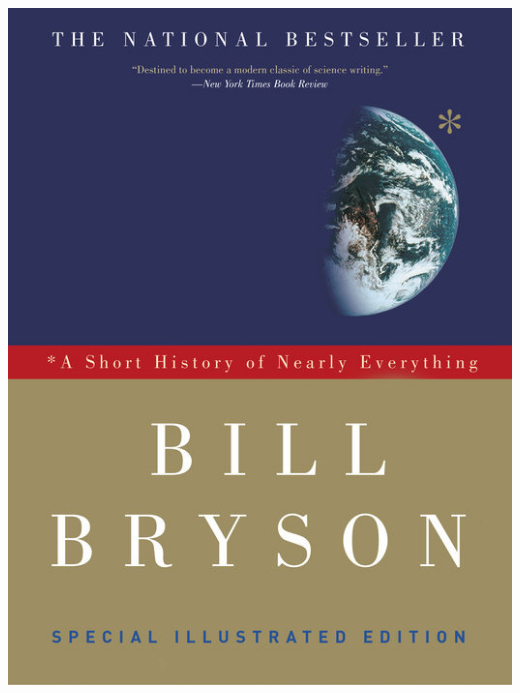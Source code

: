 \documentclass{tufte-handout}
\makeatletter
\newcommand{\varcaption}[2][0pt]{%
  \gsetlength{\@tufte@caption@vertical@offset}{-#1}%
  \gdef\@tufte@stored@varcaption{#2}%
}
\gdef\@tufte@stored@varcaption{} %
\makeatother
\begin{document}
\begin{marginfigure}[-10\baselineskip]
   \includegraphics[width=\linewidth]{images/short_history_of_nearly_everything.jpg}
   \varcaption{\href{https://www.penguinrandomhouse.com/books/20549/a-short-history-of-nearly-everything-special-illustrated-edition-by-bill-bryson/}{Publisher Link}, \href{https://www.amazon.com/Short-History-Nearly-Everything-Illustrated/dp/0307885151/}{Amazon Link}}
\end{marginfigure}
\end{document}
